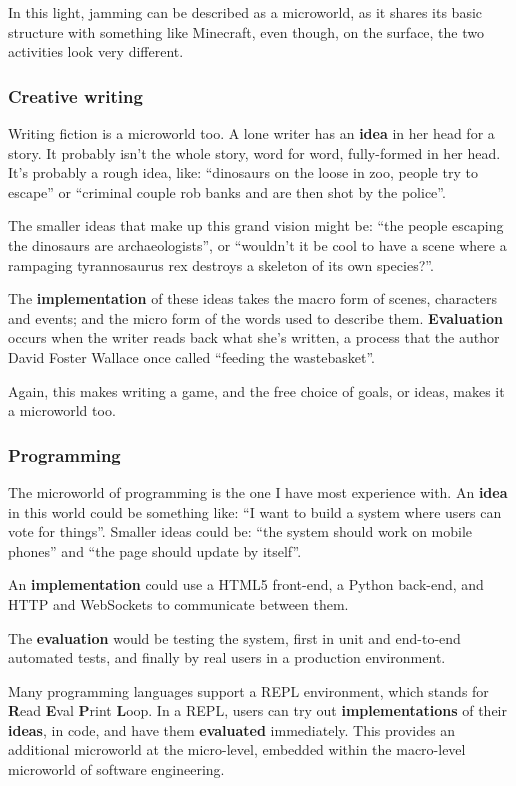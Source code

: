 In this light, jamming can be described as a microworld, as it shares
its basic structure with something like Minecraft, even though, on the
surface, the two activities look very different.

\subsubsection{Creative writing}

Writing fiction is a microworld too. A lone writer has an \textbf{idea}
in her head for a story. It probably isn't the whole story, word for
word, fully-formed in her head. It's probably a rough idea, like:
``dinosaurs on the loose in zoo, people try to escape'' or ``criminal
couple rob banks and are then shot by the police''.

The smaller ideas that make up this grand vision might be: ``the people
escaping the dinosaurs are archaeologists'', or ``wouldn't it be cool to
have a scene where a rampaging tyrannosaurus rex destroys a skeleton of
its own species?''.

The \textbf{implementation} of these ideas takes the macro form of
scenes, characters and events; and the micro form of the words used to
describe them. \textbf{Evaluation} occurs when the writer reads back
what she's written, a process that the author David Foster Wallace once
called ``feeding the wastebasket''\cite{flesh}.

Again, this makes writing a game, and the free choice of goals, or
ideas, makes it a microworld too.

\subsubsection{Programming}

The microworld of programming is the one I have most experience with. An
\textbf{idea} in this world could be something like: ``I want to build a
system where users can vote for things''. Smaller ideas could be: ``the
system should work on mobile phones'' and ``the page should update by
itself''.

An \textbf{implementation} could use a HTML5 front-end, a Python
back-end, and HTTP and WebSockets to communicate between them.

The \textbf{evaluation} would be testing the system, first in unit and
end-to-end automated tests, and finally by real users in a production
environment.

Many programming languages support a REPL environment, which stands for \textbf{R}ead \textbf{E}val \textbf{P}rint \textbf{L}oop. In a REPL, users can try out \textbf{implementations} of their \textbf{ideas}, in code, and have them \textbf{evaluated} immediately. This provides an additional microworld at the micro-level, embedded within the macro-level microworld of software engineering.

